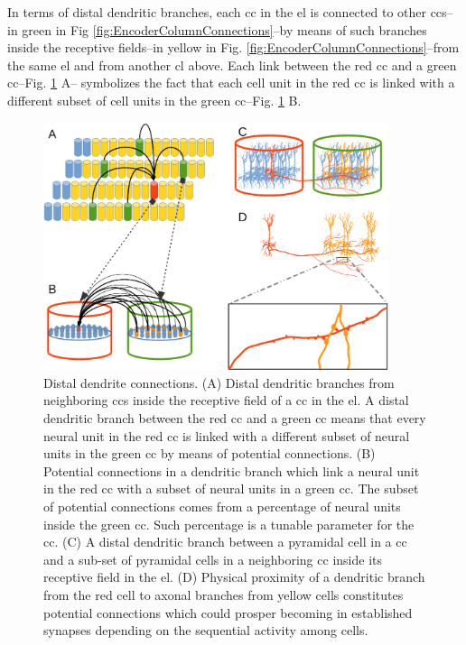 \documentclass[10pt,letterpaper]{article}
\begin{document}
In terms of distal dendritic branches, each \gls{cc} in the \gls{el} is connected to other \glspl{cc}--in green in Fig \ref{fig:EncoderColumnConnections}--by means of such
branches inside the receptive fields--in yellow in Fig. \ref{fig:EncoderColumnConnections}--from the same \gls{el} and from another \gls{cl}
above.
Each link between the red \gls{cc} and a green \gls{cc}--Fig. \ref{fig:DistalDendrites} A--
symbolizes the fact that each cell unit in
the red \gls{cc} is linked with a different subset of cell units in the green \gls{cc}--Fig. \ref{fig:DistalDendrites} B.

\begin{figure}[h!]
    \centering
    \includegraphics[width=0.9\textwidth]{DistalDendrites.png}
    \caption{Distal dendrite connections. (A) Distal dendritic branches from neighboring \glspl{cc} inside the receptive field
    of a \gls{cc} in the \gls{el}. A distal dendritic branch between the red \gls{cc} and a
    green \gls{cc} means that every neural unit in the red \gls{cc} is linked with a different
    subset of neural units in the green \gls{cc} by means of potential connections.
    (B) Potential connections in a dendritic branch which link a neural unit in the red \gls{cc}
    with a subset of neural units in a green \gls{cc}. The subset of potential connections comes from a percentage of neural units
    inside the green \gls{cc}. Such percentage is a tunable parameter for the \gls{cc}.
    (C) A distal dendritic branch between a pyramidal cell in a \gls{cc} and a 
    sub-set of pyramidal cells in a neighboring \gls{cc} inside its receptive field
    in the \gls{el}.
    (D) Physical proximity of a dendritic branch from the red cell to axonal branches from yellow cells constitutes potential connections
    which could prosper becoming in established synapses depending on the sequential activity among cells.}
    \label{fig:DistalDendrites}
\end{figure}
\end{document}
